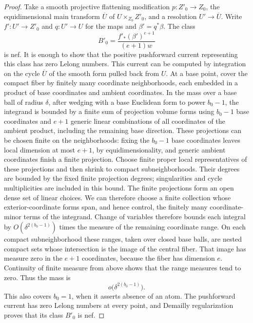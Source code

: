 \begin{proof}
Take a smooth projective flattening
modification \(p:Z'_0\to Z_0\), the equidimensional main transform
\(\overline U\) of \(U\times_{Z_0}Z'_0\), and a resolution
\(U'\to\overline U\).  Write \(f':U'\to Z'_0\) and \(q:U'\to U\) for
the maps and \(\beta'=q^*\beta\).  The class
\[
 B'_0=\frac{f'_*(\beta')^{e+1}}{(e+1)w}
\]
is nef.  It is enough to show that the positive pushforward current
representing this class has zero Lelong numbers.  This current can
be computed by integration on the cycle \(\overline U\) of the smooth
form pulled back from \(U\).  At a base point, cover the compact fiber
by finitely many coordinate neighborhoods, each embedded in a product
of base coordinates and ambient coordinates.  In the mass over a base
ball of radius \(\delta\), after wedging with a base Euclidean form to
power \(b_0-1\), the integrand is bounded by a finite sum of projection
volume forms using \(b_0-1\) base coordinates and \(e+1\) generic
linear combinations of all coordinates of the ambient product, including
the remaining base direction.  These projections can be chosen finite on the
neighborhoods: fixing the \(b_0-1\) base coordinates leaves local
dimension at most \(e+1\), by equidimensionality, and generic ambient
coordinates finish a finite projection.  Choose finite proper local
representatives of these projections and then shrink to compact
subneighborhoods.  Their degrees are bounded by the fixed finite
projection degrees; singularities and cycle multiplicities are included
in this bound.  The finite projections form an open dense set of
linear choices.  We can therefore choose a finite collection whose
exterior-coordinate forms span, and hence control, the finitely many
coordinate-minor terms of the integrand.
Change of variables
therefore bounds each integral by
\(O(\delta^{2(b_0-1)})\) times the measure of the remaining coordinate
range.  On each compact subneighborhood these ranges, taken over closed
base balls, are nested compact sets whose intersection is the image of
the central fiber.  That image has measure zero in the \(e+1\) coordinates,
because the fiber has dimension \(e\).  Continuity of finite measure from
above shows that the range measures tend to zero.  Thus the
mass is
\[
 o\bigl(\delta^{2(b_0-1)}\bigr).
\]
This also covers \(b_0=1\), when it asserts absence of an atom.  The
pushforward current has zero Lelong numbers at every point, and
Demailly regularization \cite[Theorem~1.1]{DemaillyRegularization1992}
proves that its class \(B'_0\) is nef.


\end{proof}
